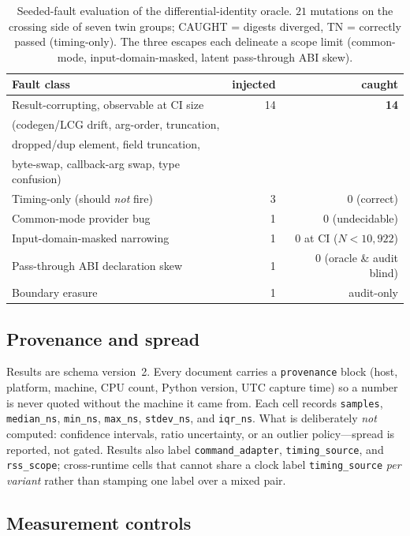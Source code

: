 \documentclass[conference]{IEEEtran}
\newcommand{\code}[1]{\texttt{#1}}
\begin{document}
\begin{table}[t]
\caption{Seeded-fault evaluation of the differential-identity oracle. $21$
mutations on the crossing side of seven twin groups; CAUGHT = digests diverged,
TN = correctly passed (timing-only). The three escapes each delineate a scope
limit (common-mode, input-domain-masked, latent pass-through ABI skew).}
\label{tab:oracleeval}
\centering
\small
\begin{tabular}{@{}lrr@{}}
\toprule
Fault class & injected & caught \\
\midrule
Result-corrupting, observable at CI size & 14 & \textbf{14} \\
\quad(codegen/LCG drift, arg-order, truncation, & & \\
\quad dropped/dup element, field truncation, & & \\
\quad byte-swap, callback-arg swap, type confusion) & & \\
Timing-only (should \emph{not} fire) & 3 & 0 (correct) \\
Common-mode provider bug & 1 & 0 (undecidable) \\
Input-domain-masked narrowing & 1 & 0 at CI ($N{<}10{,}922$) \\
Pass-through ABI declaration skew & 1 & 0 (oracle \& audit blind) \\
Boundary erasure & 1 & audit-only \\
\bottomrule
\end{tabular}
\end{table}

\subsection{Provenance and spread}

Results are schema version~2. Every document carries a \code{provenance} block
(host, platform, machine, CPU count, Python version, UTC capture time) so a
number is never quoted without the machine it came from. Each cell records
\code{samples}, \code{median\_ns}, \code{min\_ns}, \code{max\_ns},
\code{stdev\_ns}, and \code{iqr\_ns}. What is deliberately \emph{not} computed:
confidence intervals, ratio uncertainty, or an outlier policy---spread is
reported, not gated. Results also label \code{command\_adapter},
\code{timing\_source}, and \code{rss\_scope}; cross-runtime cells that cannot
share a clock label \code{timing\_source} \emph{per variant} rather than stamping
one label over a mixed pair.

\subsection{Measurement controls}
\label{sec:controls}
\end{document}
